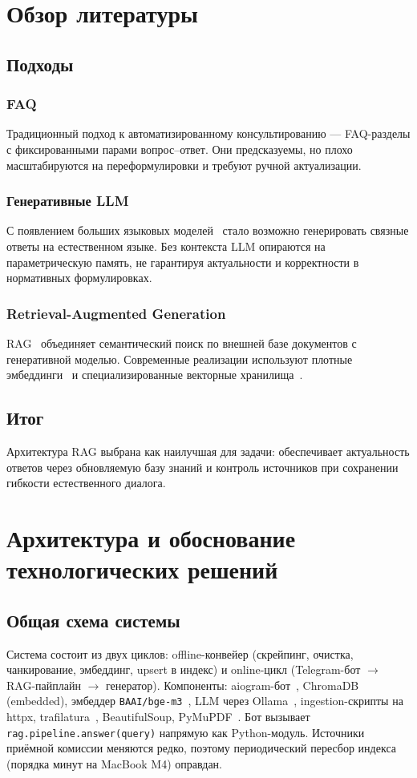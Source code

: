 \documentclass[a4paper,12pt]{extarticle}
\begin{document}
\section{Обзор литературы}

\subsection{Подходы}

\subsubsection{FAQ}
Традиционный подход к автоматизированному консультированию --- FAQ-разделы с фиксированными парами вопрос–ответ. Они предсказуемы, но плохо масштабируются на переформулировки и требуют ручной актуализации.

\subsubsection{Генеративные LLM}
С появлением больших языковых моделей~\cite{gpt} стало возможно генерировать связные ответы на естественном языке. Без контекста LLM опираются на параметрическую память, не гарантируя актуальности и корректности в нормативных формулировках.

\subsubsection{Retrieval-Augmented Generation}
RAG~\cite{ctan,rag} объединяет семантический поиск по внешней базе документов с генеративной моделью. Современные реализации используют плотные эмбеддинги~\cite{word2vec,sbert,e5,bgem3} и специализированные векторные хранилища~\cite{chromadb}.

\subsection{Итог}
Архитектура RAG выбрана как наилучшая для задачи: обеспечивает актуальность ответов через обновляемую базу знаний и контроль источников при сохранении гибкости естественного диалога.

\section{Архитектура и обоснование технологических решений}

\subsection{Общая схема системы}
Система состоит из двух циклов: offline-конвейер (скрейпинг, очистка, чанкирование, эмбеддинг, upsert в индекс) и online-цикл (Telegram-бот $\rightarrow$ RAG-пайплайн $\rightarrow$ генератор). Компоненты: aiogram-бот~\cite{aiogram}, ChromaDB~\cite{chromadb} (embedded), эмбеддер \texttt{BAAI/bge-m3}~\cite{bgem3}, LLM через Ollama~\cite{ollama}, ingestion-скрипты на httpx, trafilatura~\cite{trafilatura}, BeautifulSoup, PyMuPDF~\cite{pymupdf}. Бот вызывает \texttt{rag.pipeline.answer(query)} напрямую как Python-модуль. Источники приёмной комиссии меняются редко, поэтому периодический пересбор индекса (порядка минут на MacBook M4) оправдан.
\end{document}
